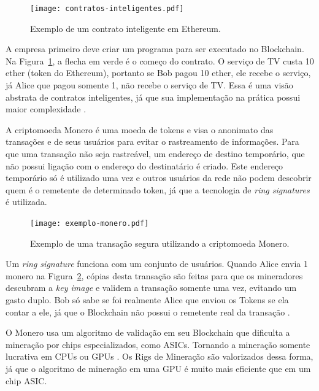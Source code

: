 \documentclass[
article,			%
12pt,				%
openright,			%
oneside,			%
a4paper,			%
chapter=TITLE,		%
section=TITLE,		%
subsection=TITLE,	%
subsubsection=TITLE,%
subsubsubsection=TITLE, %
english,			%
brazil,				%
]{abntex2}
\begin{document}
\begin{figure}[H]
    \caption{\label{fig:contratos-inteligentes}Exemplo de um contrato
    inteligente em Ethereum.}
    \begin{center}
        \texttt{[image: contratos-inteligentes.pdf]}
    \end{center}
\end{figure}

A empresa primeiro deve criar um programa para ser executado no
Blockchain. Na Figura~\ref{fig:contratos-inteligentes}, a flecha em
verde é o começo do contrato. O serviço de TV custa 10 ether (token do
Ethereum), portanto se Bob pagou 10 ether, ele recebe o serviço, já
Alice que pagou somente 1, não recebe o serviço de TV\@. Essa é uma
visão abstrata de contratos inteligentes, já que sua implementação na
prática possui maior complexidade \cite{Narayanan2016}.


A criptomoeda Monero é uma moeda de tokens e visa o anonimato das
transações e de seus usuários para evitar o rastreamento de
informações. Para que uma transação não seja rastreável, um endereço
de destino temporário, que não possui ligação com o endereço do
destinatário é criado. Este endereço temporário só é utilizado uma vez
e outros usuários da rede não podem descobrir quem é o remetente de
determinado token, já que a tecnologia de \emph{ring signatures} é
utilizada.

\begin{figure}[H]
    \caption{\label{fig:exemplo-monero}Exemplo de uma transação segura
        utilizando a criptomoeda Monero.}
    \begin{center}
        \texttt{[image: exemplo-monero.pdf]}
    \end{center}
\end{figure}

Um \emph{ring signature} funciona com um conjunto de usuários. Quando
Alice envia 1 monero na Figura~\ref{fig:exemplo-monero}, cópias desta
transação são feitas para que os mineradores descubram a \emph{key
image} e validem a transação somente uma vez, evitando um gasto duplo.
Bob só sabe se foi realmente Alice que enviou os Tokens se ela contar
a ele, já que o Blockchain não possui o remetente real da transação
\cite{Monero2017, MoneroHow2018}.

O Monero usa um algoritmo de validação em seu Blockchain que dificulta
a mineração por chips especializados, como ASICs.  Tornando a
mineração somente lucrativa em CPUs ou GPUs \cite{Weber2012}. Os Rigs
de Mineração são valorizados dessa forma, já que o algoritmo de
mineração em uma GPU é muito mais eficiente que em um chip ASIC\@.
\end{document}
